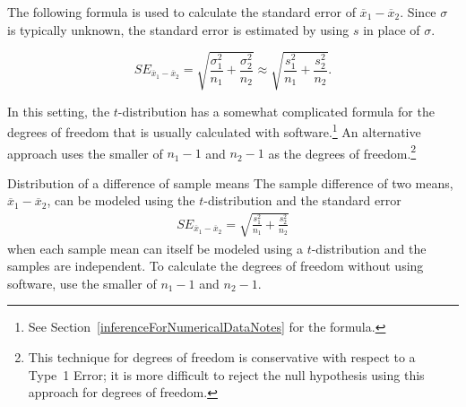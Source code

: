 
The following formula is used to calculate the standard error of $\overline{x}_{1} - \overline{x}_{2}$. Since $\sigma$ is typically unknown, the standard error is estimated by using $s$ in place of $\sigma$. 

\[
SE_{\overline{x}_{1} - \overline{x}_{2}} = \sqrt{\frac{\sigma_{1}^2}{n_{1}} + \frac{\sigma_{2}^2}{n_{2}}} \approx \sqrt{\frac{s_{1}^2}{n_{1}} + \frac{s_{2}^2}{n_{2}}}.
\]

In this setting, the $t$-distribution has a somewhat complicated formula for the degrees of freedom that is usually calculated with software.\footnote{See Section~\ref{inferenceForNumericalDataNotes} for the formula.} An alternative approach uses the smaller of $n_1 - 1$ and $n_2 - 1$ as the degrees of freedom.\footnote{This technique for degrees of freedom is conservative with respect to a Type~1 Error; it is more difficult to reject the null hypothesis using this approach for degrees of freedom.}

\textD{\newpage}

\begin{onebox}{Distribution of a difference of sample means}
The sample difference of two means, $\overline{x}_1 - \overline{x}_2$, can be modeled using the $t$-distribution and the standard error
\begin{eqnarray}
\textstyle
SE_{\overline{x}_{1} - \overline{x}_{2}} = \sqrt{\frac{s_1^2}{n_1} + \frac{s_2^2}{n_2}}
\label{seOfDifferenceInMeans}
\end{eqnarray}
when each sample mean can itself be modeled using a $t$-distribution and the samples are independent. To calculate the degrees of freedom without using software, use the smaller of $n_1 - 1$ and $n_2 - 1$.
\end{onebox}

